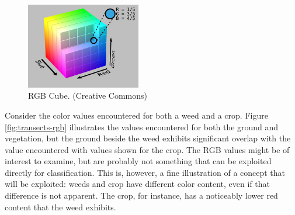 \documentclass[letterpaper]{report}
\begin{document}
%
%
\begin{figure}[H]
	\centering
	\includegraphics[width=5cm]{./figures/RGB_Cube_Show_lowgamma_cutout_b.png}
	\caption[RGB Cube]{RGB Cube. (Creative Commons)}
	\label{fig:rgb-cube}
\end{figure}

Consider the color values encountered for both a weed and a crop. Figure \ref{fig:transects-rgb} illustrates the values encountered for both the ground and vegetation, but the ground beside the weed exhibits significant overlap with the value encountered with values shown for the crop.  The RGB values might be of interest to examine, but are probably not something that can be exploited directly for classification. This is, however, a fine illustration of a concept that will be exploited: weeds and crop have different color content, even if that difference is not apparent.  The crop, for instance, has a noticeably lower red content that the weed exhibits.
\end{document}
